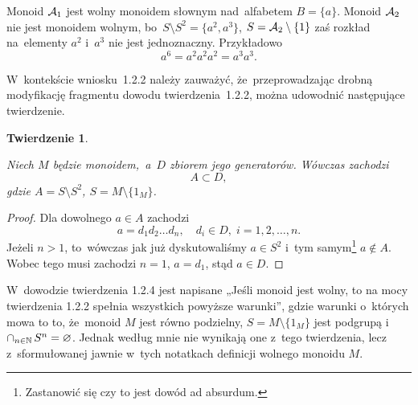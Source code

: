 \documentclass[a4paper,11pt]{article}
\newtheorem{theorem}{Twierdzenie}  %
\begin{document}
Monoid $\mathcal{A}_{ 1 }$ jest wolny monoidem słownym nad~alfabetem
$B = \{ a \}$. Monoid $\mathcal{A}_{ 2 }$ nie jest monoidem wolnym,
bo~$S \setminus S^{ 2 } = \{ a^{ 2 }, a^{ 3 } \}$,
$S = \mathcal{A}_{ 2 } \setminus \{ 1 \}$ zaś rozkład na~elementy $a^{ 2 }$
i~$a^{ 3 }$ nie jest jednoznaczny. Przykładowo
\begin{equation}
  \label{eq:Forys-Forys-36}
  a^{ 6 } = a^{ 2 } a^{ 2 } a^{ 2 } = a^{ 3 } a^{ 3 }.
\end{equation}

\vspace{\spaceFour}





\start {} W~kontekście wniosku~1.2.2 należy zauważyć,
że~przeprowadzając drobną modyfikację fragmentu dowodu
twierdzenia~1.2.2, można udowodnić następujące twierdzenie.




\begin{theorem}
  \label{thm:Forys-Forys-02}

  Niech $M$ będzie monoidem,~a~$D$ zbiorem jego generatorów. Wówczas
  zachodzi
  \begin{equation}
    \label{eq:Forys-Forys-37}
    A \subset D,
  \end{equation}
  gdzie $A = S \setminus S^{ 2 }$, $S = M \setminus \{ 1_{ M } \}$.

\end{theorem}



\begin{proof}

  Dla dowolnego $a \in A$ zachodzi
  \begin{equation}
    \label{eq:Forys-Forys-38}
    a = d_{ 1 } d_{ 2 } \ldots d_{ n }, \quad
    d_{ i } \in D,\; i = 1, 2, \ldots, n.
  \end{equation}
  Jeżeli $n > 1$, to~wówczas jak już dyskutowaliśmy $a \in S^{ 2 }$
  i~tym samym\footnote{Zastanowić się czy to jest dowód ad absurdum.}
  $a \notin A$. Wobec tego musi zachodzi $n = 1$, $a = d_{ 1 }$, stąd
  $a \in D$.

\end{proof}





\start {} W~dowodzie twierdzenia 1.2.4 jest napisane „Jeśli
monoid jest wolny, to na mocy twierdzenia 1.2.2 spełnia wszystkich
powyższe warunki”, gdzie warunki o~których mowa to to, że~monoid $M$
jest równo podzielny, $S = M \setminus \{ 1_{ M } \}$ jest podgrupą
i~$\cap_{ n \in \mathbb{N} } \, S^{ n } = \varnothing$. Jednak według mnie nie
wynikają one z~tego twierdzenia, lecz z~sformułowanej jawnie w~tych
notatkach definicji wolnego monoidu $M$.
\end{document}
